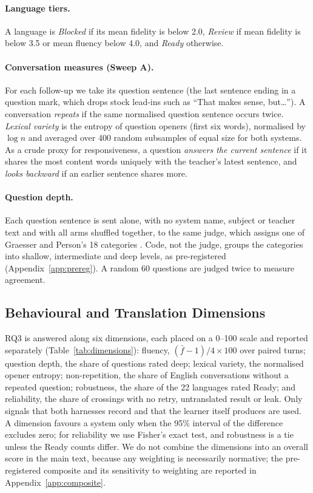 \documentclass[pdflatex,sn-mathphys-num]{sn-jnl}%
\theoremstyle{thmstyleone}%
\theoremstyle{thmstyletwo}%
\theoremstyle{thmstylethree}%
\begin{document}
\paragraph{Language tiers.} A language is \emph{Blocked} if its mean fidelity is below 2.0,
\emph{Review} if mean fidelity is below 3.5 or mean fluency below 4.0, and \emph{Ready} otherwise.

\paragraph{Conversation measures (Sweep A).} For each follow-up we take its question sentence (the
last sentence ending in a question mark, which drops stock lead-ins such as ``That makes sense,
but\ldots''). A conversation \emph{repeats} if the same normalised question sentence occurs twice.
\emph{Lexical variety} is the entropy of question openers (first six words), normalised by
$\log n$ and averaged over 400 random subsamples of equal size for both systems. As a crude proxy for
responsiveness, a question \emph{answers the current sentence} if it shares the most content words
uniquely with the teacher's latest sentence, and \emph{looks backward} if an earlier sentence shares
more.

\paragraph{Question depth.} Each question sentence is sent alone, with no system name, subject or
teacher text and with all arms shuffled together, to the same judge, which assigns one of Graesser and
Person's 18 categories \cite{graesser1994}. Code, not the judge, groups the categories into shallow,
intermediate and deep levels, as pre-registered (Appendix~\ref{app:prereg}). A random 60 questions are
judged twice to measure agreement.

\subsection{Behavioural and Translation Dimensions}\label{sec:scorecard}

RQ3 is answered along six dimensions, each placed on a 0--100 scale and reported separately
(Table~\ref{tab:dimensions}): fluency, $(\bar{f}-1)/4\times100$ over paired turns; question depth, the
share of questions rated deep; lexical variety, the normalised opener entropy; non-repetition, the
share of English conversations without a repeated question; robustness, the share of the 22 languages
rated Ready; and reliability, the share of crossings with no retry, untranslated result or leak. Only
signals that both harnesses record and that the learner itself produces are used. A dimension favours
a system only when the 95\% interval of the difference excludes zero; for reliability we use Fisher's
exact test, and robustness is a tie unless the Ready counts differ. We do not combine the dimensions
into an overall score in the main text, because any weighting is necessarily normative; the
pre-registered composite and its sensitivity to weighting are reported in Appendix~\ref{app:composite}.
\end{document}
